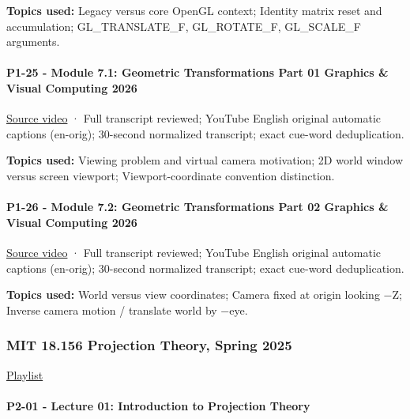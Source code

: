 \textbf{Topics used:} Legacy versus core OpenGL context; Identity matrix reset and accumulation; GL\_TRANSLATE\_F, GL\_ROTATE\_F, GL\_SCALE\_F arguments.

\paragraph{P1-25 - Module 7.1: Geometric Transformations Part 01 Graphics \& Visual Computing 2026}\label{p1-25---module-7.1-geometric-transformations-part-01-graphics-visual-computing-2026}

\href{https://www.youtube.com/watch?v=oeEe2WiSku8}{Source video} · Full transcript reviewed; YouTube English original automatic captions (en-orig); 30-second normalized transcript; exact cue-word deduplication.

\textbf{Topics used:} Viewing problem and virtual camera motivation; 2D world window versus screen viewport; Viewport-coordinate convention distinction.

\paragraph{P1-26 - Module 7.2: Geometric Transformations Part 02 Graphics \& Visual Computing 2026}\label{p1-26---module-7.2-geometric-transformations-part-02-graphics-visual-computing-2026}

\href{https://www.youtube.com/watch?v=GnIE0V5dS1w}{Source video} · Full transcript reviewed; YouTube English original automatic captions (en-orig); 30-second normalized transcript; exact cue-word deduplication.

\textbf{Topics used:} World versus view coordinates; Camera fixed at origin looking −Z; Inverse camera motion / translate world by −eye.

\subsubsection{MIT 18.156 Projection Theory, Spring 2025}\label{mit-18.156-projection-theory-spring-2025}

\href{https://www.youtube.com/playlist?list=PLUl4u3cNGP62K9_7Pg26ytrAOXwXFpN43}{Playlist}

\paragraph{P2-01 - Lecture 01: Introduction to Projection Theory}\label{p2-01---lecture-01-introduction-to-projection-theory}

